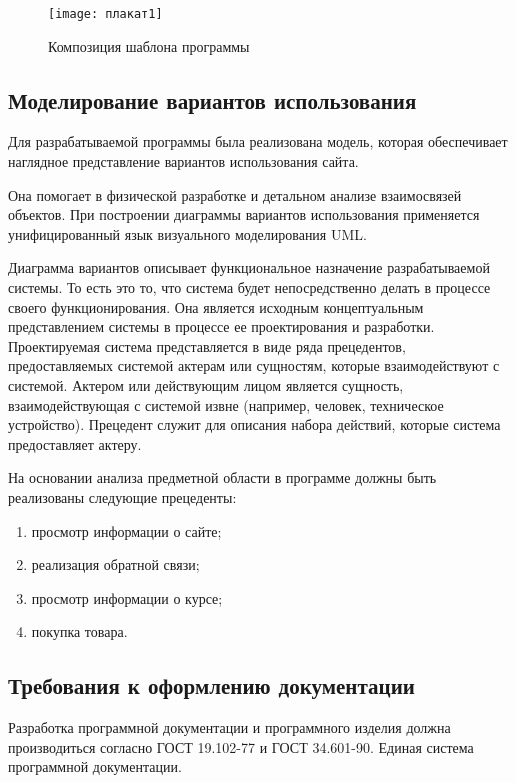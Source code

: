 \begin{figure}[ht]
	\texttt{[image: плакат1]}
	\caption{Композиция шаблона программы}
	\label{плакат1:image}
\end{figure}

\subsection{Моделирование вариантов использования}

Для разрабатываемой программы была реализована модель, которая обеспечивает наглядное представление вариантов использования сайта.

Она помогает в физической разработке и детальном анализе взаимосвязей объектов. При построении диаграммы вариантов использования применяется унифицированный язык визуального моделирования UML.

Диаграмма вариантов описывает функциональное назначение разрабатываемой системы. То есть это то, что система будет непосредственно делать в процессе своего функционирования. Она является исходным концептуальным представлением системы в процессе ее проектирования и разработки. Проектируемая система представляется в виде ряда прецедентов, предоставляемых системой актерам или сущностям, которые взаимодействуют с системой. Актером или действующим лицом является сущность, взаимодействующая с системой извне (например, человек, техническое устройство). Прецедент служит для описания набора действий, которые система предоставляет актеру.

На основании анализа предметной области в программе должны быть реализованы следующие прецеденты:
\begin{enumerate}
	\item просмотр информации о сайте;
	\item реализация обратной связи;
	\item просмотр информации о курсе;
	\item покупка товара.
\end{enumerate}

\subsection{Требования к оформлению документации}

Разработка программной документации и программного изделия должна производиться согласно ГОСТ 19.102-77 и ГОСТ 34.601-90. Единая система программной документации.
